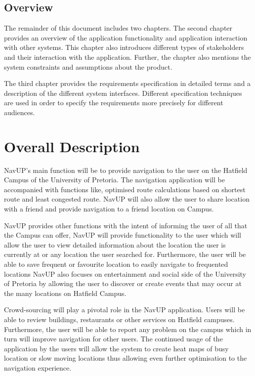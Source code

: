 \documentclass[12pt,a4paper]{article}
\begin{document}
	\subsection{Overview}
	The remainder of this document includes two chapters. The second chapter provides an overview of the application functionality and application interaction with other systems. This chapter also introduces different types of stakeholders and their interaction with the application. Further, the chapter also mentions the system constraints and assumptions about the product.\newline

The third chapter provides the requirements specification in detailed terms and a description of the different system interfaces. Different specification techniques are used in order to specify the requirements more precisely for different audiences.

\section{Overall Description}
NavUP's main function will be to provide navigation to the user on the Hatfield Campus of the University of Pretoria. The navigation application will be accompanied with functions like, optimised route calculations based on shortest route and least congested route. NavUP will also allow the user to share location with a friend and provide navigation to a friend location on Campus.\newline

NavUP provides other functions with the intent of informing the user of all that the Campus can offer, NavUP will provide functionality to the user which will allow the user to view detailed information about the location the user is currently at or any location the user searched for. Furthermore, the user will be able to save frequent or favourite location to easily navigate to frequented locations
NavUP also focuses on entertainment and social side of the University of Pretoria by allowing the user to discover or create events that may occur at the many locations on Hatfield Campus.\newline


Crowd-sourcing will play a pivotal role in the NavUP application. Users will be able to review buildings, restaurants or other services on Hatfield campuses. Furthermore, the user will be able to report any problem on the campus which in turn will improve navigation for other users. The continued usage of the application by the users will allow the system to create heat maps of busy location or slow moving locations thus allowing even further optimisation to the navigation experience.\newline
\end{document}
